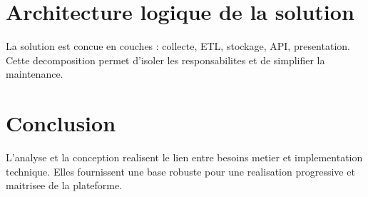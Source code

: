 \section{Architecture logique de la solution}
La solution est concue en couches : collecte, ETL, stockage, API, presentation. Cette decomposition permet d'isoler les responsabilites et de simplifier la maintenance.


\section{Conclusion}
L'analyse et la conception realisent le lien entre besoins metier et implementation technique. Elles fournissent une base robuste pour une realisation progressive et maitrisee de la plateforme.

\clearpage
